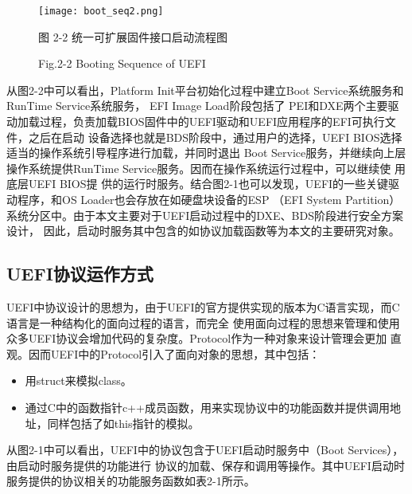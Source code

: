 \begin{figure}[htb]
    \vspace{0cm}   
    \setlength{\abovecaptionskip}{0.3cm}  
	\centering
    \texttt{[image: boot\_seq2.png]}
    \caption*{图 2-2 统一可扩展固件接口启动流程图}
    \setlength{\belowcaptionskip}{-0.7cm}
    \caption*{Fig.2-2 Booting Sequence of UEFI}
\end{figure}

从图2-2中可以看出，Platform Init平台初始化过程中建立Boot Service系统服务和RunTime Service系统服务，
EFI Image Load阶段包括了
PEI和DXE两个主要驱动加载过程，负责加载BIOS固件中的UEFI驱动和UEFI应用程序的EFI可执行文件，之后在启动
设备选择也就是BDS阶段中，通过用户的选择，UEFI BIOS选择适当的操作系统引导程序进行加载，并同时退出
Boot Service服务，并继续向上层操作系统提供RunTime Service服务。因而在操作系统运行过程中，可以继续使
用底层UEFI BIOS提
供的运行时服务。结合图2-1也可以发现，UEFI的一些关键驱动程序，和OS Loader也会存放在如硬盘块设备的ESP
（EFI System Partition）系统分区中。由于本文主要对于UEFI启动过程中的DXE、BDS阶段进行安全方案设计，
因此，启动时服务其中包含的如协议加载函数等为本文的主要研究对象。

\subsection{UEFI协议运作方式}
UEFI中协议设计的思想为，由于UEFI的官方提供实现的版本为C语言实现，而C语言是一种结构化的面向过程的语言，而完全
使用面向过程的思想来管理和使用众多UEFI协议会增加代码的复杂度。Protocol作为一种对象来设计管理会更加
直观\cite{english13,english12}。因而UEFI中的Protocol引入了面向对象的思想，其中包括：
\begin{itemize}
\item 用struct来模拟class。
\item 通过C中的函数指针c++成员函数，用来实现协议中的功能函数并提供调用地址，同样包括了如this指针的模拟。
\end{itemize}
\par 从图2-1中可以看出，UEFI中的协议包含于UEFI启动时服务中（Boot Services），由启动时服务提供的功能进行
协议的加载、保存和调用等操作。其中UEFI启动时服务提供的协议相关的功能服务函数如表2-1所示。

